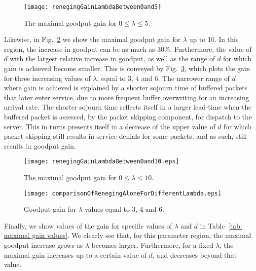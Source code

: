 \documentclass[preprint,12pt]{elsarticle}
\theoremstyle{definition}
\theoremstyle{plain}
\theoremstyle{remark}
\begin{document}
\begin{figure}[t]
\begin{center}
\texttt{[image: renegingGainLambdaBetween0and5]}
\caption{The maximal goodput gain for $0\leq \lambda \leq 5$.}
\label{fig: maximal gain up to 5}
\end{center}
\end{figure}



Likewise, in Fig.~\ref{fig: maximal gain up to 10} we show the maximal goodput gain for $\lambda$ up to 10. In this region, the increase in goodput can be as much as $30\%$. Furthermore, the value of $d$ with the largest relative increase in goodput, as well as the range of $d$ for which gain is achieved become smaller. This is conveyed by Fig.~\ref{fig: Goodput different rates}, which plots the gain for three increasing values of $\lambda$, equal to 3, 4 and 6.
The narrower range of $d$ where gain is achieved is explained by a shorter sojourn time of buffered packets that later enter service, due to more frequent buffer overwriting for an increasing arrival rate. The shorter sojourn time reflects itself in a larger lead-time when the buffered packet is assessed, by the packet skipping component, for dispatch to the server. This in turns presents itself in a decrease of the upper value of $d$ for which packet skipping still results in service denials for some packets, and as such, still results in goodput gain.

\begin{figure}[t]
\begin{center}
  \texttt{[image: renegingGainLambdaBetween0and10.eps]}
  \caption{The maximal goodput gain for $0\leq \lambda \leq 10$.}
  \label{fig: maximal gain up to 10}
\end{center}
\end{figure}

\begin{figure}[t]
\begin{center}
  \texttt{[image: comparisonOfRenegingAloneForDifferentLambda.eps]}
  \caption{Goodput gain for $\lambda$ values equal to 3, 4 and 6.}
  \label{fig: Goodput different rates}
\end{center}
\end{figure}

Finally, we show values of the gain for specific values of $\lambda$ and $d$ in Table~\ref{tab: maximal gain values}. We clearly see that, for this parameter region, the maximal goodput increase grows as $\lambda$ becomes larger. Furthermore, for a fixed $\lambda$, the maximal gain increases up to a certain value of $d$, and decreases beyond that value.
\end{document}
